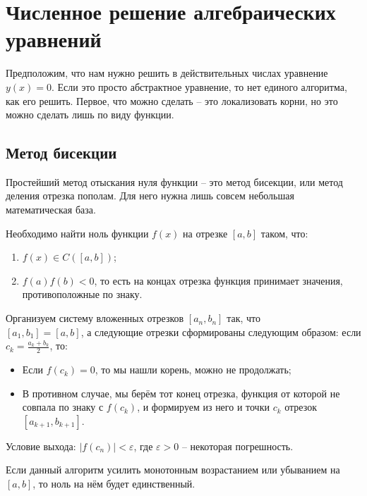 \documentclass[main.tex]{subfile}
\begin{document}
\section{Численное решение алгебраических уравнений}

Предположим, что нам нужно решить в действительных числах уравнение
$y(x)=0$. Если это просто абстрактное уравнение, то нет единого
алгоритма, как его решить. Первое, что можно сделать -- это локализовать
корни, но это можно сделать лишь по виду функции.

\subsection{Метод бисекции}

Простейший метод отыскания нуля функции -- это метод бисекции, или метод
деления отрезка пополам. Для него нужна лишь совсем небольшая математическая
база.

\begin{algorithm}
	Необходимо найти ноль функции $f(x)$ на отрезке $[a,b]$ таком, что:
	\begin{enumerate}
		\item $f(x)\in C([a,b])$;
		\item $f(a)f(b)<0$, то есть на концах отрезка функция
			принимает значения, противоположные по знаку.
	\end{enumerate}\leavevmode\newline

	Организуем систему вложенных отрезков $[a_n, b_n]$ так, что\\
	$[a_1, b_1]=[a,b]$, а следующие отрезки сформированы следующим образом:
	если $c_k=\frac{a_k+b_k}{2}$, то:
	\begin{itemize}[noitemsep, nolistsep]
		\item Если $f(c_k)=0$, то мы нашли корень, можно не продолжать;
		\item В противном случае, мы берём тот конец отрезка, функция от
			которой не совпала по знаку с $f(c_k)$, и формируем из него
			и точки $c_k$ отрезок $[a_{k+1},b_{k+1}]$.
	\end{itemize}

	Условие выхода: $|f(c_n)|<\varepsilon$, где $\varepsilon>0$ -- некоторая
	погрешность.

	Если данный алгоритм усилить монотонным возрастанием или убыванием на $[a,b]$,
	то ноль на нём будет единственный.
\end{algorithm}
\end{document}
